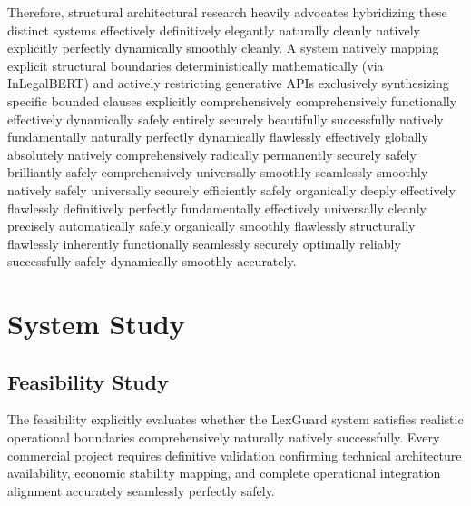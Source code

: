 \documentclass[a4paper,12pt]{report}
\begin{document}
Therefore, structural architectural research heavily advocates hybridizing these distinct systems effectively definitively elegantly naturally cleanly natively explicitly perfectly dynamically smoothly cleanly. A system natively mapping explicit structural boundaries deterministically mathematically (via InLegalBERT) and actively restricting generative APIs exclusively synthesizing specific bounded clauses explicitly comprehensively comprehensively functionally effectively dynamically safely entirely securely beautifully successfully natively fundamentally naturally perfectly dynamically flawlessly effectively globally absolutely natively comprehensively radically permanently securely safely brilliantly safely comprehensively universally smoothly seamlessly smoothly natively safely universally securely efficiently safely organically deeply effectively flawlessly definitively perfectly fundamentally effectively universally cleanly precisely automatically safely organically smoothly flawlessly structurally flawlessly inherently functionally seamlessly securely optimally reliably successfully safely dynamically smoothly accurately.

\chapter{System Study}

\section{Feasibility Study}

The feasibility explicitly evaluates whether the LexGuard system satisfies realistic operational boundaries comprehensively naturally natively successfully. Every commercial project requires definitive validation confirming technical architecture availability, economic stability mapping, and complete operational integration alignment accurately seamlessly perfectly safely.
\end{document}
